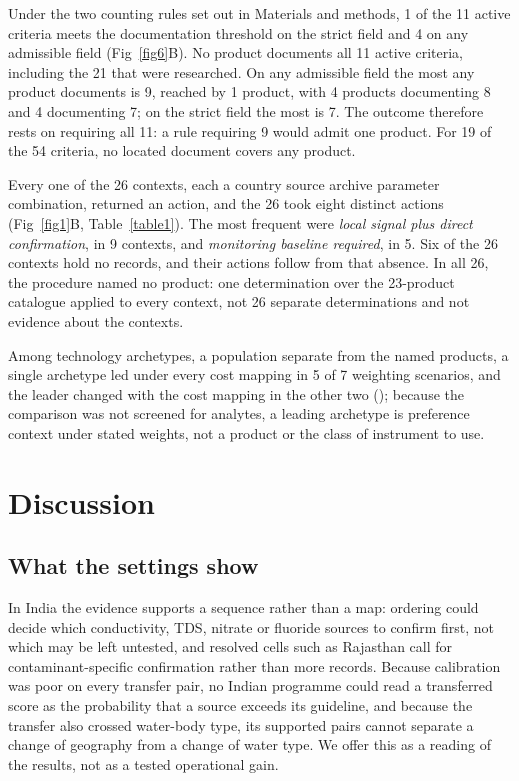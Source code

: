\documentclass[10pt,letterpaper]{article}
\begin{document}
Under the two counting rules set out in Materials and methods, 1 of the 11 active criteria meets the documentation threshold on the strict field and 4 on any admissible field (Fig~\ref{fig6}B). No product documents all 11 active criteria, including the 21 that were researched. On any admissible field the most any product documents is 9, reached by 1 product, with 4 products documenting 8 and 4 documenting 7; on the strict field the most is 7. The outcome therefore rests on requiring all 11: a rule requiring 9 would admit one product. For 19 of the 54 criteria, no located document covers any product.

Every one of the 26 contexts, each a country \texttimes{} source archive \texttimes{} parameter combination, returned an action, and the 26 took eight distinct actions (Fig~\ref{fig1}B, Table~\ref{table1}). The most frequent were \textit{local signal plus direct confirmation}, in 9 contexts, and \textit{monitoring baseline required}, in 5. Six of the 26 contexts hold no records, and their actions follow from that absence. In all 26, the procedure named no product: one determination over the 23-product catalogue applied to every context, not 26 separate determinations and not evidence about the contexts.

Among technology archetypes, a population separate from the named products, a single archetype led under every cost mapping in 5 of 7 weighting scenarios, and the leader changed with the cost mapping in the other two (); because the comparison was not screened for analytes, a leading archetype is preference context under stated weights, not a product or the class of instrument to use.

\section*{Discussion}

\subsection*{What the settings show}

In India the evidence supports a sequence rather than a map: ordering could decide which conductivity, TDS, nitrate or fluoride sources to confirm first, not which may be left untested, and resolved cells such as Rajasthan call for contaminant-specific confirmation rather than more records. Because calibration was poor on every transfer pair, no Indian programme could read a transferred score as the probability that a source exceeds its guideline, and because the transfer also crossed water-body type, its supported pairs cannot separate a change of geography from a change of water type. We offer this as a reading of the results, not as a tested operational gain.
\end{document}
